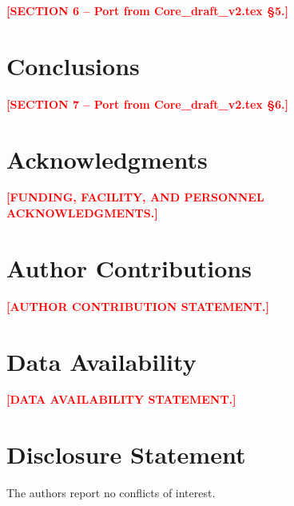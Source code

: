 \documentclass[]{interact}
\newcommand{\INSERT}[1]{\textcolor{red}{\textbf{[#1]}}}
\begin{document}
\INSERT{SECTION 6 -- Port from Core\_draft\_v2.tex \S5.}


\section{Conclusions}
\label{sec:conclusions}

\INSERT{SECTION 7 -- Port from Core\_draft\_v2.tex \S6.}


\section*{Acknowledgments}
\INSERT{FUNDING, FACILITY, AND PERSONNEL ACKNOWLEDGMENTS.}

\section*{Author Contributions}
\INSERT{AUTHOR CONTRIBUTION STATEMENT.}

\section*{Data Availability}
\INSERT{DATA AVAILABILITY STATEMENT.}

\section*{Disclosure Statement}
The authors report no conflicts of interest.



\end{document}
